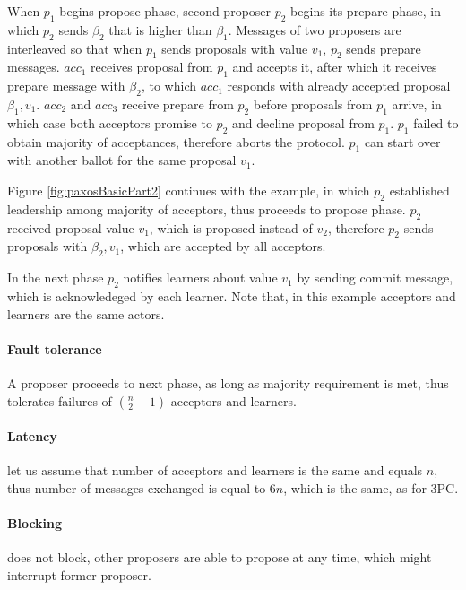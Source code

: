 When $p_1$ begins propose phase, second proposer $p_2$ begins its prepare phase, in which $p_2$ sends $\beta_2$ that is higher than $\beta_1$. Messages of two proposers are interleaved so that when $p_1$ sends proposals with value $v_1$, $p_2$ sends prepare messages. $acc_1$ receives proposal from $p_1$ and accepts it, after which it receives prepare message with $\beta_2$, to which $acc_1$ responds with already accepted proposal $\beta_1,v_1$.
$acc_2$ and $acc_3$ receive prepare from $p_2$ before proposals from $p_1$ arrive, in which case both acceptors promise to $p_2$ and decline proposal from $p_1$. $p_1$ failed to obtain majority of acceptances, therefore aborts the protocol. $p_1$ can start over with another ballot for the same proposal $v_1$. 

Figure \ref{fig:paxosBasicPart2} continues with the example, in which
 $p_2$ established leadership among majority of acceptors, thus proceeds to propose phase. $p_2$ received proposal value $v_1$, which is proposed instead of $v_2$, therefore $p_2$ sends proposals with $\beta_2,v_1$, which are accepted by all acceptors.

 In the next phase $p_2$ notifies learners about value $v_1$ by sending commit message, which is acknowledeged by each learner. Note that, in this example acceptors and learners are the same actors.

 \paragraph{Fault tolerance} A proposer proceeds to next phase, as long as majority requirement is met, thus \paxos tolerates failures of 
 $(\frac{n}{2}-1)$ acceptors and learners.

 \paragraph{Latency} let us assume that number of acceptors and learners is the same and equals $n$, thus number of messages exchanged is equal to $6n$, which is the same, as for 3PC.

 \paragraph{Blocking} \paxos does not block, other proposers are able to propose at any time, which might interrupt former proposer.



